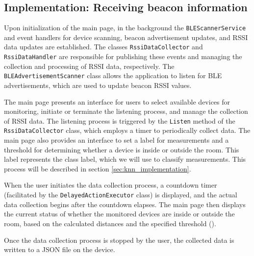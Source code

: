 \subsection{Implementation: Receiving beacon information}\label{sec:ble_implementation}
Upon initialization of the main page, in the background the \texttt{BLEScannerService} and event handlers for device scanning, beacon advertisement updates, and RSSI data updates are established.
The classes \texttt{RssiDataCollector} and \texttt{RssiDataHandler} are responsible for publishing these events and managing the collection and processing of RSSI data, respectively.
The \texttt{BLEAdvertisementScanner} class allows the application to listen for BLE advertisements, which are used to update beacon RSSI values.

The main page presents an interface for users to select available devices for monitoring, initiate or terminate the listening process, and manage the collection of RSSI data. 
The listening process is triggered by the \texttt{Listen} method of the \texttt{RssiDataCollector} class, which employs a timer to periodically collect data. 
The main page also provides an interface to set a label for measurements and a threshold for determining whether a device is inside or outside the room. 
This label represents the class label, which we will use to classify measurements. 
This process will be described in section \ref{sec:knn_implementation}.

When the user initiates the data collection process, a countdown timer (facilitated by the \texttt{DelayedActionExecutor} class) is displayed, and the actual data collection begins after the countdown elapses.
The main page then displays the current status of whether the monitored devices are inside or outside the room, based on the calculated distances and the specified threshold ().

Once the data collection process is stopped by the user, the collected data is written to a JSON file on the device.


